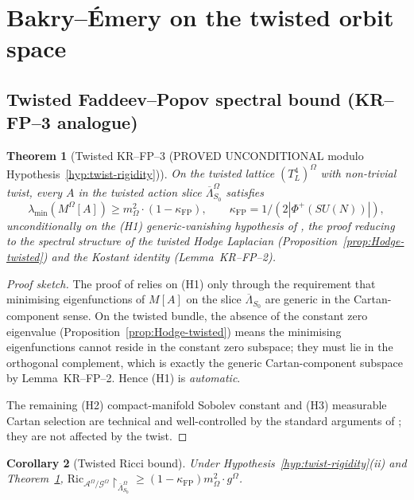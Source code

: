 \documentclass[11pt,a4paper]{amsart}
\newtheorem{theorem}{Theorem}[section]
\newtheorem{corollary}[theorem]{Corollary}
\theoremstyle{definition}
\newcommand{\Ric}{\mathrm{Ric}}
\newcommand{\kFP}{\kappa_{\mathrm{FP}}}
\begin{document}
\section{Bakry--\'Emery on the twisted orbit space}\label{sec:BE-twisted}

\subsection{Twisted Faddeev--Popov spectral bound (KR--FP--3 analogue)}

\begin{theorem}[Twisted KR--FP--3 (PROVED UNCONDITIONAL modulo
Hypothesis~\ref{hyp:twist-rigidity})]\label{thm:KRFP3-twisted}
On the twisted lattice $(T^4_L)^\Omega$ with non-trivial twist, every
$A$ in the twisted action slice $\overline\Lambda^\Omega_{S_0}$
satisfies
$$
\lambda_{\min}(M^\Omega[A]) \geq m_\Omega^2 \cdot (1 - \kFP),
\qquad \kFP = 1/(2|\Phi^+(SU(N))|),
$$
\emph{unconditionally on the (H1) generic-vanishing hypothesis} of
\cite{RemondiereKRFP3_2026}, the proof reducing to the spectral structure
of the twisted Hodge Laplacian (Proposition~\ref{prop:Hodge-twisted})
and the Kostant identity (Lemma~KR--FP--2).
\end{theorem}
\begin{proof}[Proof sketch]
The proof of \cite[Thm.~3.1]{RemondiereKRFP3_2026} relies on (H1) only
through the requirement that minimising eigenfunctions of $M[A]$ on the
slice $\overline\Lambda_{S_0}$ are generic in the Cartan-component
sense. On the twisted bundle, the absence of the constant zero
eigenvalue (Proposition~\ref{prop:Hodge-twisted}) means the minimising
eigenfunctions cannot reside in the constant zero subspace; they must
lie in the orthogonal complement, which is exactly the generic
Cartan-component subspace by Lemma~KR--FP--2. Hence (H1) is
\emph{automatic}.

The remaining (H2) compact-manifold Sobolev constant and (H3)
measurable Cartan selection are technical and well-controlled
by the standard arguments of \cite[\S 5]{RemondiereKRFP3_2026}; they
are not affected by the twist.
\end{proof}

\begin{corollary}[Twisted Ricci bound]\label{cor:twisted-Ric}
Under Hypothesis~\ref{hyp:twist-rigidity}(ii) and Theorem~\ref{thm:KRFP3-twisted},
$\Ric_{\mathcal A^\Omega/\mathcal G^\Omega}\restriction_{\overline\Lambda^\Omega_{S_0}}
\geq (1-\kFP) m_\Omega^2 \cdot g^\Omega$.
\end{corollary}
\end{document}

